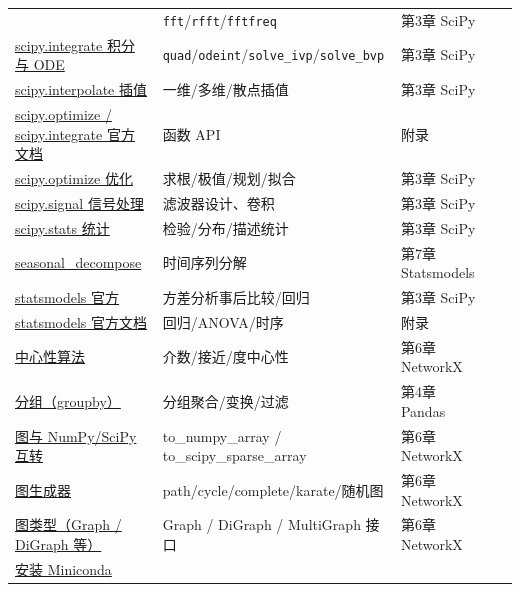 {\begin{longtable}[]
{傅里叶变换} & \texttt{fft}/\texttt{rfft}/\texttt{fftfreq} & 第3章
SciPy \\
\href{https://docs.scipy.org/doc/scipy/reference/integrate.html}{scipy.integrate
积分与 ODE} &
\texttt{quad}/\texttt{odeint}/\texttt{solve\_ivp}/\texttt{solve\_bvp} &
第3章 SciPy \\
\href{https://docs.scipy.org/doc/scipy/reference/interpolate.html}{scipy.interpolate
插值} & 一维/多维/散点插值 & 第3章 SciPy \\
\href{https://docs.scipy.org/doc/scipy/reference/}{scipy.optimize /
scipy.integrate 官方文档} & 函数 API & 附录 \\
\href{https://docs.scipy.org/doc/scipy/reference/optimize.html}{scipy.optimize
优化} & 求根/极值/规划/拟合 & 第3章 SciPy \\
\href{https://docs.scipy.org/doc/scipy/reference/signal.html}{scipy.signal
信号处理} & 滤波器设计、卷积 & 第3章 SciPy \\
\href{https://docs.scipy.org/doc/scipy/reference/stats.html}{scipy.stats
统计} & 检验/分布/描述统计 & 第3章 SciPy \\
\href{https://www.statsmodels.org/stable/generated/statsmodels.tsa.seasonal.seasonal_decompose.html}{seasonal\_decompose}
& 时间序列分解 & 第7章 Statsmodels \\
\href{https://www.statsmodels.org/stable/}{statsmodels 官方} &
方差分析事后比较/回归 & 第3章 SciPy \\
\href{https://www.statsmodels.org/stable/index.html}{statsmodels
官方文档} & 回归/ANOVA/时序 & 附录 \\
\href{https://networkx.org/documentation/stable/reference/algorithms/centrality.html}{中心性算法}
& 介数/接近/度中心性 & 第6章 NetworkX \\
\href{https://pandas.pydata.org/docs/user_guide/groupby.html}{分组（groupby）}
& 分组聚合/变换/过滤 & 第4章 Pandas \\
\href{https://networkx.org/documentation/stable/reference/convert.html}{图与
NumPy/SciPy 互转} & to\_numpy\_array / to\_scipy\_sparse\_array & 第6章
NetworkX \\
\href{https://networkx.org/documentation/stable/reference/generators.html}{图生成器}
& path/cycle/complete/karate/随机图 & 第6章 NetworkX \\
\href{https://networkx.org/documentation/stable/reference/classes/index.html}{图类型（Graph
/ DiGraph 等）} & Graph / DiGraph / MultiGraph 接口 & 第6章 NetworkX \\
\href{https://docs.conda.io/en/latest/miniconda.html}{安装 Miniconda} &

\end{longtable}}
